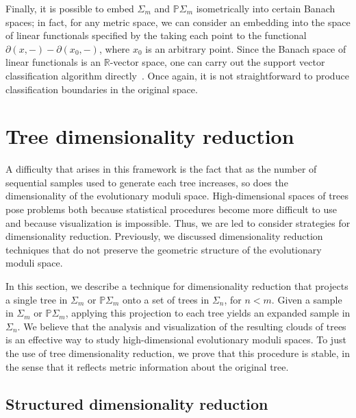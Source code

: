 \documentclass[a4paper,11pt]{article}
\begin{document}
Finally, it is possible to embed $\Sigma_m$ and $\mathbb{P}\Sigma_m$ isometrically into certain Banach spaces; in fact, for any metric space, we can consider an embedding into the space of linear functionals specified by the taking each point to the functional $\partial(x,-) - \partial(x_0,-)$, where $x_0$ is an arbitrary point.
Since the Banach space of linear functionals is an $\mathbb{R}$-vector space, one can carry out the support vector classification algorithm directly~\cite{hein2003}.
Once again, it is not straightforward to produce classification boundaries in the original space.



\section{Tree dimensionality reduction}\label{sec:treedimred}

A difficulty that arises in this framework is the fact that as the number of sequential samples used to generate each tree increases, so does the dimensionality of the evolutionary moduli space.
High-dimensional spaces of trees pose problems both because statistical procedures become more difficult to use and because visualization is impossible.
Thus, we are led to consider strategies for dimensionality reduction.
Previously, we discussed dimensionality reduction techniques that do not preserve the geometric structure of the evolutionary moduli space.

In this section, we describe a technique for dimensionality reduction that projects a single tree in $\Sigma_m$ or $\mathbb{P}\Sigma_m$ onto a set of trees in $\Sigma_{n}$, for $n < m$.
Given a sample in $\Sigma_m$ or $\mathbb{P}\Sigma_m$, applying this projection to each tree yields an expanded sample in $\Sigma_n$.
We believe that the analysis and visualization of the resulting clouds of trees is an effective way to study high-dimensional evolutionary moduli spaces.
To just the use of tree dimensionality reduction, we prove that this procedure is stable, in the sense that it reflects metric information about the original tree.

\subsection{Structured dimensionality reduction}
\end{document}
